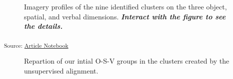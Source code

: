 \documentclass[
  authoryear]{elsarticle}
\begin{document}
\label{cell-fig-osv-clusters}
\begin{figure}[H]


\caption{\label{fig-osv-clusters}Imagery profiles of the nine identified
clusters on the three object, spatial, and verbal dimensions.
\textbf{\emph{Interact with the figure to see the details.}}}

\end{figure}%

\textsubscript{Source:
\href{https://m-delem.github.io/2499-similarity-manuscript/index.qmd.html}{Article
Notebook}}

\label{cell-fig-clusters-distribution}
\begin{figure}[H]


\caption{\label{fig-clusters-distribution}Repartion of our intial O-S-V
groups in the clusters created by the unsupervised alignment.}

\end{figure}%
\end{document}
